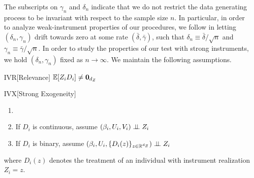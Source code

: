 The subscripts on \(\gamma_n\) and \(\delta_n\) indicate that we do not restrict 
the data generating process to be invariant with respect to the sample size \(n\). In particular, in order to analyze weak-instrument properties of our procedures, we follow \cite{staigerInstrumentalVariablesRegression1997} in letting \((\delta_n, \gamma_n)\) drift towards zero at some rate \((\bar \delta, \bar \gamma)\), such that
   \(\delta_n \equiv  {\bar \delta}/{\sqrt{n}}\) and 
   \(\gamma_n \equiv  {\bar \gamma}/{\sqrt{n}} \).
In order to study the properties of our test with strong instruments, we hold \((\delta_n, \gamma_n)\) fixed as \(n\to\infty\).
We maintain the following assumptions.
\begin{assumptionp}{IVR}[Relevance]\label{ass:rel}
\(\mathbb{E}[Z_iD_i] \neq \mathbf{0}_{d_Z}\)
\end{assumptionp}
\begin{assumptionp}{IVX}[Strong Exogeneity]\label{ass:exog}
    \begin{enumerate}[label={\emph{(\alph*)}}, ref={(\alph*)}]
       \item[]
       \item \label{ass:assump-exog-a}
       If \(D_i\) is continuous, assume \((\beta_i,U_i,V_i) \perp \!\!\! \perp Z_i\) 
       \item \label{ass:assump-exog-b}
       If \(D_i\) is binary, assume \((\beta_i,U_i,\{D_i(z)\}_{z\in\mathbb{R}^{d_Z}} ) \perp \!\!\! \perp Z_i\) 
\end{enumerate} \vspace{8pt}

\noindent 
where \(D_i(z)\) denotes the treatment of an individual with instrument realization \(Z_i=z\).
\end{assumptionp}
